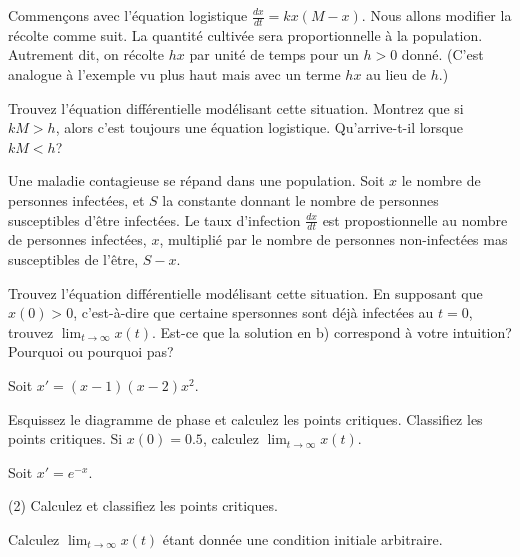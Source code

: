 \begin{exercise}
Commençons avec l'équation logistique
$\frac{dx}{dt} = kx(M-x)$.
Nous allons modifier la récolte comme suit.  La quantité cultivée sera proportionnelle à la population.  Autrement dit, on récolte $hx$
par unité de temps pour un  $h > 0$ donné.   (C'est analogue à l'exemple vu plus haut mais avec un terme $hx$ au lieu de  $h$.)
\begin{tasks}
\task Trouvez l'équation différentielle modélisant cette situation. 
\task Montrez que si $kM > h$, alors c'est toujours une équation logistique.
\task Qu'arrive-t-il lorsque  $kM < h$?
\end{tasks}
\end{exercise}

\begin{exercise}
Une maladie contagieuse se répand dans une population.  Soit $x$ le nombre de personnes infectées, et $S$ la constante donnant le nombre de personnes susceptibles  d'être infectées.  Le taux d'infection $\frac{dx}{dt}$ est propostionnelle au nombre de personnes infectées, $x$, multiplié par le nombre de personnes non-infectées mas susceptibles de l'être, $S-x$.
\begin{tasks}
\task Trouvez l'équation différentielle modélisant cette situation. 
\task En supposant que $x(0) > 0$, c'est-à-dire que certaine spersonnes sont déjà infectées au $t=0$,
trouvez 
$\displaystyle \lim_{t\to\infty} x(t)$.
\task Est-ce que la solution en b) correspond à votre intuition? Pourquoi ou pourquoi pas?
\end{tasks}
\end{exercise}


\setcounter{exercise}{100}

\begin{exercise}
Soit $x'=(x-1)(x-2)x^2$.
\begin{tasks}
\task Esquissez le diagramme de phase et calculez les points critiques.
\task Classifiez les points critiques.
\task Si $x(0)=0.5$, calculez $\displaystyle \lim_{t\to\infty} x(t)$.
\end{tasks}
\end{exercise}

\begin{exercise}
Soit $x'=e^{-x}$.
\begin{tasks}(2)
\task Calculez et classifiez les points critiques.

\task Calculez $\displaystyle \lim_{t\to\infty} x(t)$ étant donnée une condition initiale arbitraire.
\end{tasks}
\end{exercise}

